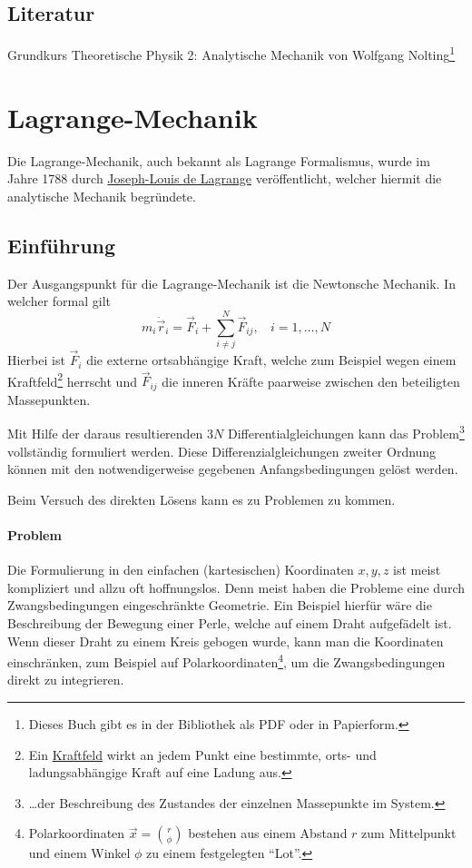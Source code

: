 \documentclass[oneside]{book}
\theoremstyle{definition}
\newcommand{\ddotvec}[1]{\ddot{\vec{#1}}}
\begin{document}
\subsection{Literatur} Grundkurs Theoretische Physik 2: Analytische Mechanik von Wolfgang Nolting\footnote{Dieses Buch gibt es in der Bibliothek als PDF oder in Papierform.}



\section{Lagrange-Mechanik}

Die Lagrange-Mechanik, auch bekannt als Lagrange Formalismus, wurde im Jahre 1788 durch \href{http://de.wikipedia.org/wiki/Joseph-Louis_Lagrange}{Joseph-Louis de Lagrange} veröffentlicht, welcher hiermit die analytische Mechanik begründete. 

\subsection{Einführung}
Der Ausgangspunkt für die Lagrange-Mechanik ist die Newtonsche Mechanik. In welcher formal gilt
$$ m_i \ddotvec{r}_i = \vec{F}_i + \sum_{i \neq j}^{N} \vec{F}_{ij}, ~~~~i = 1, \dots, N$$
Hierbei ist $\vec{F}_i$ die externe ortsabhängige Kraft, welche zum Beispiel wegen einem Kraftfeld\footnote{Ein \href{http://de.wikipedia.org/wiki/Kraftfeld}{Kraftfeld} wirkt an jedem Punkt eine bestimmte, orts- und ladungsabhängige Kraft auf eine Ladung aus.} herrscht und $\vec{F}_{ij}$ die inneren Kräfte paarweise zwischen den beteiligten Massepunkten.

Mit Hilfe der daraus resultierenden $3N$ Differentialgleichungen kann das Problem\footnote{\dots der Beschreibung des Zustandes der einzelnen Massepunkte im System.} vollständig formuliert werden. Diese Differenzialgleichungen zweiter Ordnung können mit den notwendigerweise gegebenen Anfangsbedingungen gelöst werden.

Beim Versuch des direkten Lösens kann es zu Problemen zu kommen. 

\paragraph{Problem} Die Formulierung in den einfachen (kartesischen) Koordinaten $x, y, z$ ist meist kompliziert und allzu oft hoffnungslos.
Denn meist haben die Probleme eine durch Zwangsbedingungen eingeschränkte Geometrie. Ein Beispiel hierfür wäre die Beschreibung der Bewegung einer Perle, welche auf einem Draht aufgefädelt ist. Wenn dieser Draht zu einem Kreis gebogen wurde, kann man die Koordinaten einschränken, zum Beispiel auf Polarkoordinaten\footnote{Polarkoordinaten $\vec{x} = \binom{r}{\phi}$ bestehen aus einem Abstand $r$ zum Mittelpunkt und einem Winkel $\phi$ zu einem festgelegten "`Lot"'.}, um die Zwangsbedingungen direkt zu integrieren.
\end{document}
